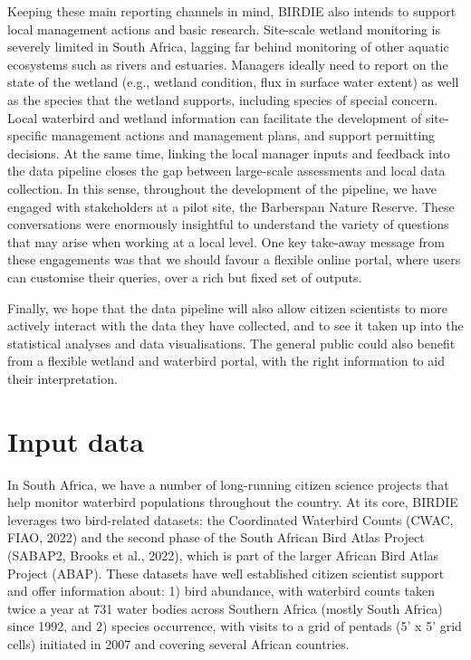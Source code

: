\documentclass[utf8]{frontiersSCNS}
\begin{document}
Keeping these main reporting channels in mind, BIRDIE also intends to
support local management actions and basic research. Site-scale wetland
monitoring is severely limited in South Africa, lagging far behind
monitoring of other aquatic ecosystems such as rivers and estuaries.
Managers ideally need to report on the state of the wetland (e.g.,
wetland condition, flux in surface water extent) as well as the species
that the wetland supports, including species of special concern. Local
waterbird and wetland information can facilitate the development of
site-specific management actions and management plans, and support
permitting decisions. At the same time, linking the local manager inputs
and feedback into the data pipeline closes the gap between large-scale
assessments and local data collection. In this sense, throughout the
development of the pipeline, we have engaged with stakeholders at a
pilot site, the Barberspan Nature Reserve. These conversations were
enormously insightful to understand the variety of questions that may
arise when working at a local level. One key take-away message from
these engagements was that we should favour a flexible online portal,
where users can customise their queries, over a rich but fixed set of
outputs.

Finally, we hope that the data pipeline will also allow citizen
scientists to more actively interact with the data they have collected,
and to see it taken up into the statistical analyses and data
visualisations. The general public could also benefit from a flexible
wetland and waterbird portal, with the right information to aid their
interpretation.

\hypertarget{input-data}{%
\section*{Input data}\label{input-data}}

In South Africa, we have a number of long-running citizen science
projects that help monitor waterbird populations throughout the country.
At its core, BIRDIE leverages two bird-related datasets: the Coordinated
Waterbird Counts (CWAC, FIAO, 2022) and the second phase of the South
African Bird Atlas Project (SABAP2, Brooks et al., 2022), which is part
of the larger African Bird Atlas Project (ABAP). These datasets have
well established citizen scientist support and offer information about:
1) bird abundance, with waterbird counts taken twice a year at 731 water
bodies across Southern Africa (mostly South Africa) since 1992, and 2)
species occurrence, with visits to a grid of pentads (5' x 5' grid
cells) initiated in 2007 and covering several African countries.
\end{document}

